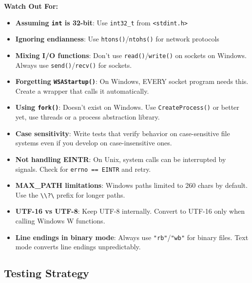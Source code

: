 \begin{warningbox}
\textbf{Watch Out For:}
\begin{itemize}
    \item \textbf{Assuming \texttt{int} is 32-bit}: Use \texttt{int32\_t} from \texttt{<stdint.h>}

    \item \textbf{Ignoring endianness}: Use \texttt{htons()}/\texttt{ntohs()} for network protocols

    \item \textbf{Mixing I/O functions}: Don't use \texttt{read()}/\texttt{write()} on sockets on Windows. Always use \texttt{send()}/\texttt{recv()} for sockets.

    \item \textbf{Forgetting \texttt{WSAStartup()}}: On Windows, EVERY socket program needs this. Create a wrapper that calls it automatically.

    \item \textbf{Using \texttt{fork()}}: Doesn't exist on Windows. Use \texttt{CreateProcess()} or better yet, use threads or a process abstraction library.

    \item \textbf{Case sensitivity}: Write tests that verify behavior on case-sensitive file systems even if you develop on case-insensitive ones.

    \item \textbf{Not handling EINTR}: On Unix, system calls can be interrupted by signals. Check for \texttt{errno == EINTR} and retry.

    \item \textbf{MAX\_PATH limitations}: Windows paths limited to 260 chars by default. Use the \texttt{\textbackslash\textbackslash?\textbackslash} prefix for longer paths.

    \item \textbf{UTF-16 vs UTF-8}: Keep UTF-8 internally. Convert to UTF-16 only when calling Windows W functions.

    \item \textbf{Line endings in binary mode}: Always use \texttt{"rb"}/\texttt{"wb"} for binary files. Text mode converts line endings unpredictably.
\end{itemize}
\end{warningbox}

\subsection{Testing Strategy}

